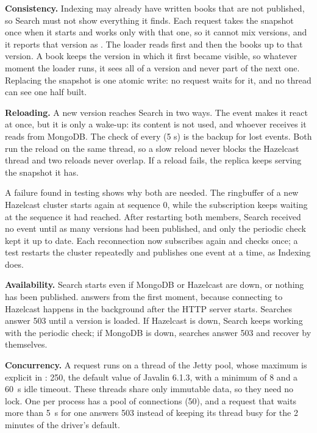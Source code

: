 \textbf{Consistency.} Indexing may already have written books that are not published, so Search must not show
everything it finds. Each request takes the snapshot once when it starts and works only with that one, so it
cannot mix versions, and it reports that version as . The loader reads  first
and then the books up to that version. A book keeps the version in which it first became visible, so whatever
moment the loader runs, it sees all of a version and never part of the next one. Replacing the snapshot is one
atomic write: no request waits for it, and no thread can see one half built.

\textbf{Reloading.} A new version reaches Search in two ways. The  event makes it react at
once, but it is only a wake-up: its content is not used, and whoever receives it reads  from
MongoDB. The check of  every  (5 s) is the backup for lost events.
Both run the reload on the same thread, so a slow reload never blocks the Hazelcast thread and two
reloads never overlap. If a reload fails, the replica keeps serving the snapshot it has.

A failure found in testing shows why both are needed. The ringbuffer of a new Hazelcast cluster starts again at
sequence 0, while the subscription keeps waiting at the sequence it had reached. After restarting both members,
Search received no event until as many versions had been published, and only the periodic check kept it up to
date. Each reconnection now subscribes again and checks  once; a test restarts the cluster
repeatedly and publishes one event at a time, as Indexing does.

\textbf{Availability.} Search starts even if MongoDB or Hazelcast are down, or nothing has been published.
 answers from the first moment, because connecting to Hazelcast happens in the background after the
HTTP server starts. Searches answer 503 until a version is loaded. If Hazelcast is down, Search keeps working with
the periodic check; if MongoDB is down, searches answer 503  and recover by themselves.

\textbf{Concurrency.} A request runs on a thread of the Jetty pool, whose maximum is explicit in
: 250, the default value of Javalin 6.1.3, with a minimum of 8 and a 60~s idle
timeout. These threads share only immutable data, so they need no lock. One  per process has a pool
of  connections (50), and a request that waits more than 5~s for one answers
503 instead of keeping its thread busy for the 2 minutes of the driver's default.

